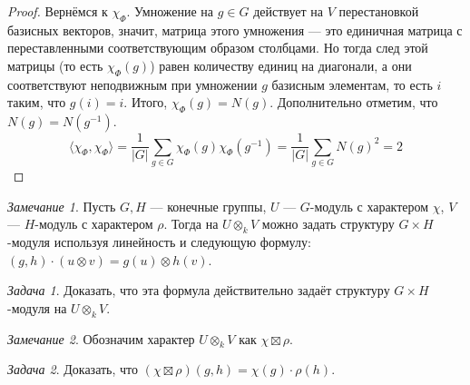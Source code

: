 \documentclass{article}
\theoremstyle{definition}
\theoremstyle{remark}
\newtheorem*{remark}{Замечание}
\newtheorem{prb}{Задача}
\newenvironment{problem}
{\begin{prb}
\label{\theprb}}
{\end{prb}}
\begin{document}
\begin{proof}
    Вернёмся к $\chi_\Phi$. Умножение на $g \in G$ действует на $V$ перестановкой базисных векторов, значит, матрица этого умножения --- это единичная матрица с переставленными соответствующим образом столбцами. Но тогда след этой матрицы (то есть $\chi_\Phi(g)$) равен количеству единиц на диагонали, а они соответствуют неподвижным при умножении $g$ базисным элементам, то есть $i$ таким, что $g(i) = i$. Итого, $\chi_\Phi(g) = N(g)$. Дополнительно отметим, что $N(g) = N(g^{-1})$.
    \begin{equation*}
        \langle \chi_\Phi, \chi_\Phi \rangle = \frac{1}{|G|} \sum_{g \in G} \chi_\Phi(g) \chi_\Phi(g^{-1}) = \frac{1}{|G|} \sum_{g \in G} N(g)^2 = 2
    \end{equation*}
\end{proof}

\begin{remark}
    Пусть $G, H$ --- конечные группы, $U$ --- $G$-модуль с характером $\chi$, $V$ --- $H$-модуль с характером $\rho$. Тогда на $U \otimes_k V$ можно задать структуру $G \times H$-модуля используя линейность и следующую формулу: $(g, h) \cdot (u \otimes v) = g(u) \otimes h(v)$.
\end{remark}

\begin{problem}
    Доказать, что эта формула действительно задаёт структуру $G \times H$-модуля на $U \otimes_k V$.
\end{problem}

\begin{remark}
    Обозначим характер $U \otimes_k V$ как $\chi \boxtimes \rho$.
\end{remark}

\begin{problem}
    Доказать, что $(\chi \boxtimes \rho)(g, h) = \chi(g) \cdot \rho(h)$.
\end{problem}
\end{document}
